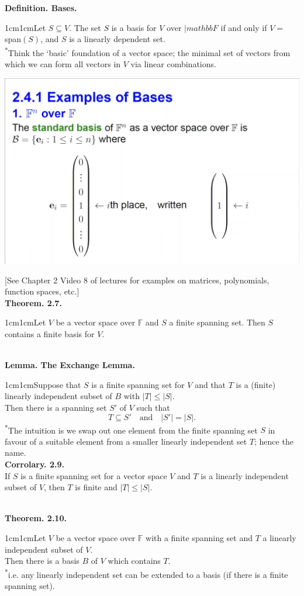\documentclass{article}
\newcommand{\definition}[2]{\textbf{Definition. #1.}\begin{adjustwidth}{1cm}{1cm}#2\end{adjustwidth}}
\newcommand{\theorem}[2]{\textbf{Theorem. #1.}\begin{adjustwidth}{1cm}{1cm}#2\end{adjustwidth}}
\newcommand{\lemma}[2]{\textbf{Lemma. #1.}\begin{adjustwidth}{1cm}{1cm}#2\end{adjustwidth}}
\begin{document}
\definition{Bases}{Let $S \subseteq V$. The set $S$ is a basis for $V$ over $|mathbb{F}$ if and only if $V =$ span$(S)$, and $S$ is a linearly dependent set.\\[1\baselineskip]\textsuperscript{*}Think the `basic' foundation of a vector space; the minimal set of vectors from which we can form all vectors in $V$ via linear combinations.}
\begin{center}
  \includegraphics[scale=0.23]{assets/basis_eg.png}
\end{center}
[See Chapter 2 Video 8 of lectures for examples on matrices, polynomials, function spaces, etc.]\\[1\baselineskip]
\theorem{2.7}{Let $V$ be a vector space over $\mathbb{F}$ and $S$ a finite spanning set. Then $S$ contains a finite basis for $V$.}~\\
\lemma{The Exchange Lemma}{Suppose that $S$ is a finite spanning set for $V$ and that $T$ is a (finite) linearly independent subset of $B$ with $|T| \leq |S|$.\\Then there is a spanning set $S'$ of $V$ such that \[T \subseteq S' \quad \text{and} \quad |S'| = |S|.\]\textsuperscript{*}The intuition is we swap out one element from the finite spanning set $S$ in favour of a suitable element from a smaller linearly independent set $T$; hence the name.\\[1\baselineskip]
\textbf{Corrolary. 2.9.}\\If $S$ is a finite spanning set for a vector space $V$ and $T$ is a linearly independent subset of $V$, then $T$ is finite and $|T| \leq |S|$.}~\\
\theorem{2.10}{Let $V$ be a vector space over $\mathbb{F}$ with a finite spanning set and $T$ a linearly independent subset of $V$.\\Then there is a basis $B$ of $V$ which contains $T$.\\ \textsuperscript{*}i.e. any linearly independent set can be extended to a basis (if there is a finite spanning set).}~\\ 
\end{document}
